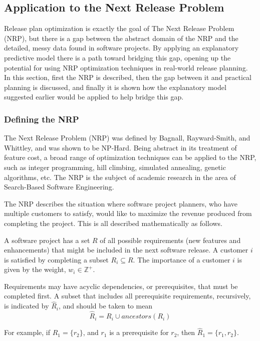 \documentclass[a4paper]{scrartcl}
\begin{document}
\subsection*{Application to the Next Release Problem}
Release plan optimization is exactly the goal of The Next Release Problem (NRP), but there is a gap between the abstract domain of the NRP and the detailed, messy data found in software projects. By applying an explanatory predictive model there is a path toward bridging this gap, opening up the potential for using NRP optimization techniques in real-world release planning. In this section, first the NRP is described, then the gap between it and practical planning is discussed, and finally it is shown how the explanatory model suggested earlier would be applied to help bridge this gap.

\subsubsection*{Defining the NRP}
The Next Release Problem (NRP) was defined by Bagnall, Rayward-Smith, and Whittley\cite{2001_bagnall_nrp}, and was shown to be NP-Hard. Being abstract in its treatment of feature cost, a broad range of optimization techniques can be applied to the NRP, such as integer programming, hill climbing, simulated annealing, genetic algorithms, etc. The NRP is the subject of academic research in the area of Search-Based Software Engineering\cite{2010_jiang_hybrid,2012_xuan_solving,2007_zhang_multi_obj_nrp}.

The NRP describes the situation where software project planners, who have multiple customers to satisfy, would like to maximize the revenue produced from completing the project. This is all described mathematically as follows.

A software project has a set $R$ of all possible requirements (new features and enhancements) that might be included in the next software release. A customer $i$ is satisfied by completing a subset $R_i \subseteq R$. The importance of a customer $i$ is given by the weight, $w_i \in \mathbb{Z}^+$.

Requirements may have acyclic dependencies, or prerequisites, that must be completed first. A subset that includes all prerequisite requirements, recursively, is indicated by $\hat{R}_i$, and should be taken to mean
\begin{equation}
\hat{R}_i = R_i \cup ancestors(R_i)
\end{equation}

For example, if $R_1 = \{r_2\}$, and $r_1$ is a prerequisite for $r_2$, then $\hat{R}_1 = \{r_1,r_2\}$.
\end{document}
